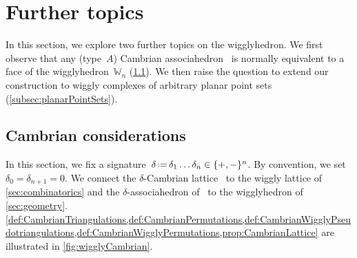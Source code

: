 \documentclass{amsart}
\theoremstyle{definition}
\newcommand{\eqdef}{\mbox{\,\raisebox{0.2ex}{\scriptsize\ensuremath{\mathrm:}}\ensuremath{=}\,}} %
\newcommand{\polytope}[1]{\mathds{#1}} %
\newcommand{\wigglyhedron}{\polytope{W}} %
\begin{document}

\section{Further topics}
\label{sec:furtherTopics}

In this section, we explore two further topics on the wigglyhedron.
We first observe that any (type~$A$) Cambrian associahedron~\cite{Reading-CambrianLattices,HohlwegLange} is normally equivalent to a face of the wigglyhedron~$\wigglyhedron_n$ (\cref{subsec:CambrianConsiderations}).
We then raise the question to extend our construction to wiggly complexes of arbitrary planar point sets (\cref{subsec:planarPointSets}).


\subsection{Cambrian considerations}
\label{subsec:CambrianConsiderations}

In this section, we fix a signature~$\delta \eqdef \delta_1 \dots \delta_n \in \{+,-\}^n$. By convention, we set~$\delta_0 = \delta_{n+1} = 0$.
We connect the $\delta$-Cambrian lattice~\cite{Reading-CambrianLattices} to the wiggly lattice of \cref{sec:combinatorics} and the $\delta$-associahedron of~\cite{HohlwegLange} to the wigglyhedron of \cref{sec:geometry}.
\cref{def:CambrianTriangulations,def:CambrianPermutations,def:CambrianWigglyPseudotriangulations,def:CambrianWigglyPermutations,prop:CambrianLattice} are illustrated in \cref{fig:wigglyCambrian}.
\end{document}

